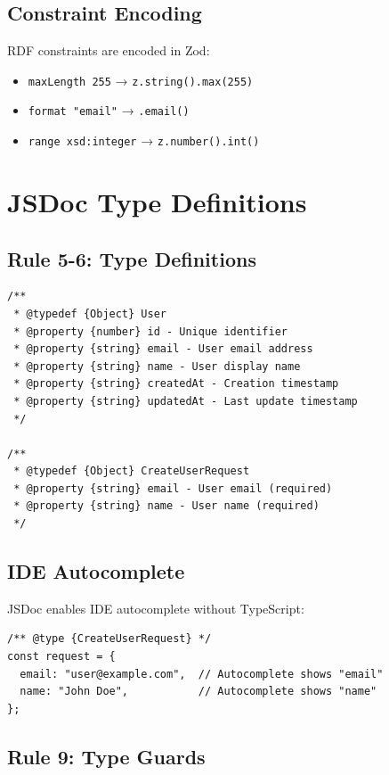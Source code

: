 \subsection{Constraint Encoding}

RDF constraints are encoded in Zod:
\begin{itemize}
    \item \texttt{maxLength 255} → \texttt{z.string().max(255)}
    \item \texttt{format "email"} → \texttt{.email()}
    \item \texttt{range xsd:integer} → \texttt{z.number().int()}
\end{itemize}

\section{JSDoc Type Definitions}

\subsection{Rule 5-6: Type Definitions}

\begin{verbatim}
/**
 * @typedef {Object} User
 * @property {number} id - Unique identifier
 * @property {string} email - User email address
 * @property {string} name - User display name
 * @property {string} createdAt - Creation timestamp
 * @property {string} updatedAt - Last update timestamp
 */

/**
 * @typedef {Object} CreateUserRequest
 * @property {string} email - User email (required)
 * @property {string} name - User name (required)
 */
\end{verbatim}

\subsection{IDE Autocomplete}

JSDoc enables IDE autocomplete without TypeScript:

\begin{verbatim}
/** @type {CreateUserRequest} */
const request = {
  email: "user@example.com",  // Autocomplete shows "email"
  name: "John Doe",           // Autocomplete shows "name"
};
\end{verbatim}

\subsection{Rule 9: Type Guards}

